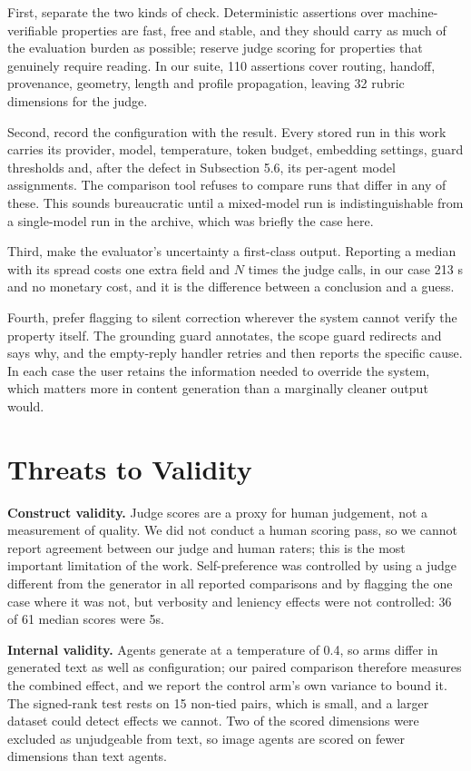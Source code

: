 \documentclass[9pt,twocolumn]{extarticle}
\begin{document}
First, separate the two kinds of check. Deterministic assertions over
machine-verifiable properties are fast, free and stable, and they should carry
as much of the evaluation burden as possible; reserve judge scoring for
properties that genuinely require reading. In our suite, 110 assertions cover
routing, handoff, provenance, geometry, length and profile propagation, leaving
32 rubric dimensions for the judge.

Second, record the configuration with the result. Every stored run in this work
carries its provider, model, temperature, token budget, embedding settings,
guard thresholds and, after the defect in Subsection 5.6, its per-agent model
assignments. The comparison tool refuses to compare runs that differ in any of
these. This sounds bureaucratic until a mixed-model run is indistinguishable
from a single-model run in the archive, which was briefly the case here.

Third, make the evaluator's uncertainty a first-class output. Reporting a
median with its spread costs one extra field and $N$ times the judge calls, in
our case 213 s and no monetary cost, and it is the difference between a
conclusion and a guess.

Fourth, prefer flagging to silent correction wherever the system cannot verify
the property itself. The grounding guard annotates, the scope guard redirects
and says why, and the empty-reply handler retries and then reports the specific
cause. In each case the user retains the information needed to override the
system, which matters more in content generation than a marginally cleaner
output would.

\section{Threats to Validity}

\textbf{Construct validity.} Judge scores are a proxy for human judgement, not
a measurement of quality. We did not conduct a human scoring pass, so we cannot
report agreement between our judge and human raters; this is the most important
limitation of the work. Self-preference was controlled by using a judge
different from the generator in all reported comparisons and by flagging the
one case where it was not, but verbosity and leniency effects were not
controlled: 36 of 61 median scores were 5s.

\textbf{Internal validity.} Agents generate at a temperature of 0.4, so arms
differ in generated text as well as configuration; our paired comparison
therefore measures the combined effect, and we report the control arm's own
variance to bound it. The signed-rank test rests on 15 non-tied pairs, which is
small, and a larger dataset could detect effects we cannot. Two of the scored
dimensions were excluded as unjudgeable from text, so image agents are scored
on fewer dimensions than text agents.
\end{document}
